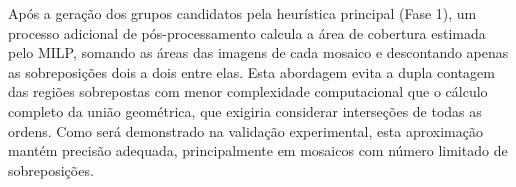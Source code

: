 \documentclass[a4paper,11pt]{article}
\begin{document}
Após a geração dos grupos candidatos pela heurística principal (Fase 1), um processo adicional de pós-processamento calcula a área de cobertura estimada pelo MILP, somando as áreas das imagens de cada mosaico e descontando apenas as sobreposições dois a dois entre elas. Esta abordagem evita a dupla contagem das regiões sobrepostas com menor complexidade computacional que o cálculo completo da união geométrica, que exigiria considerar interseções de todas as ordens. Como será demonstrado na validação experimental, esta aproximação mantém precisão adequada, principalmente em mosaicos com número limitado de sobreposições.

\vspace{-2mm}
\algnewcommand{}
\algnewcommand{}
\end{document}
